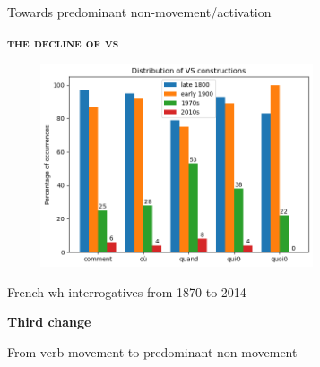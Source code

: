 \documentclass[lesson_slides]{subfiles}
\begin{document}
\begin{frame}[c]{Towards predominant non-movement/activation}

    \textbf{\textsc{the decline of vs}}
    \begin{center}
        \includegraphics[width=10cm, height=6cm]{images/VS5.png}
    \end{center}
  
\end{frame}
\begin{frame}[c]{French wh-interrogatives from 1870 to 2014}
    
\begin{center}
    \textbf{Third change}
\end{center}
  
\end{frame}
\begin{frame}[c]{From verb movement to predominant non-movement}
  
\end{frame}
\end{document}
